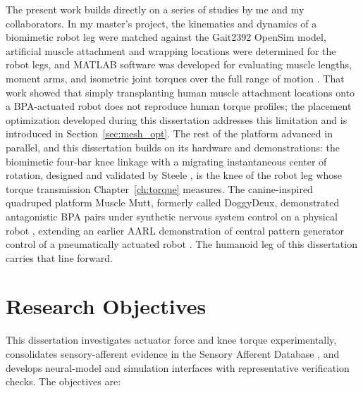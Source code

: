 The present work builds directly on a series of studies by me and my collaborators. In my master's project, the kinematics and dynamics of a biomimetic robot leg were matched against the Gait2392 OpenSim model, artificial muscle attachment and wrapping locations were determined for the robot legs, and MATLAB software was developed for evaluating muscle lengths, moment arms, and isometric joint torques over the full range of motion \citep{bolen_bipedal_2019, bolen_determination_2019}. That work showed that simply transplanting human muscle attachment locations onto a BPA-actuated robot does not reproduce human torque profiles; the placement optimization developed during this dissertation addresses this limitation and is introduced in Section~\ref{sec:mesh_opt}. The rest of the platform advanced in parallel, and this dissertation builds on its hardware and demonstrations: the biomimetic four-bar knee linkage with a migrating instantaneous center of rotation, designed and validated by Steele \citep{steele_development_2017, steele_biomimetic_2018, steele_biomimetic_2018-1}, is the knee of the robot leg whose torque transmission Chapter~\ref{ch:torque} measures. The canine-inspired quadruped platform Muscle Mutt, formerly called DoggyDeux, demonstrated antagonistic BPA pairs under synthetic nervous system control on a physical robot \citep{scharzenberger_design_2019}, extending an earlier AARL demonstration of central pattern generator control of a pneumatically actuated robot \citep{hunt_development_2017}. The humanoid leg of this dissertation carries that line forward.

\section{Research Objectives}\label{sec:objectives}

This dissertation investigates actuator force and knee torque experimentally, consolidates sensory-afferent evidence in the Sensory Afferent Database \citep{bolen_sensory_2023, bolen_using_2024}, and develops neural-model and simulation interfaces with representative verification checks. The objectives are:

